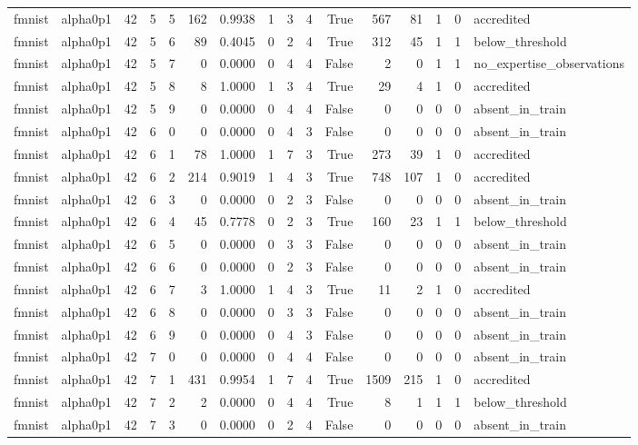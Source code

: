 \begin{tabular}{llrrrrrrrrrrrrrl}
fmnist & alpha0p1 & 42 & 5 & 5 & 162 & 0.9938 & 1 & 3 & 4 & True & 567 & 81 & 1 & 0 & accredited \\
fmnist & alpha0p1 & 42 & 5 & 6 & 89 & 0.4045 & 0 & 2 & 4 & True & 312 & 45 & 1 & 1 & below\_threshold \\
fmnist & alpha0p1 & 42 & 5 & 7 & 0 & 0.0000 & 0 & 4 & 4 & False & 2 & 0 & 1 & 1 & no\_expertise\_observations \\
fmnist & alpha0p1 & 42 & 5 & 8 & 8 & 1.0000 & 1 & 3 & 4 & True & 29 & 4 & 1 & 0 & accredited \\
fmnist & alpha0p1 & 42 & 5 & 9 & 0 & 0.0000 & 0 & 4 & 4 & False & 0 & 0 & 0 & 0 & absent\_in\_train \\
fmnist & alpha0p1 & 42 & 6 & 0 & 0 & 0.0000 & 0 & 4 & 3 & False & 0 & 0 & 0 & 0 & absent\_in\_train \\
fmnist & alpha0p1 & 42 & 6 & 1 & 78 & 1.0000 & 1 & 7 & 3 & True & 273 & 39 & 1 & 0 & accredited \\
fmnist & alpha0p1 & 42 & 6 & 2 & 214 & 0.9019 & 1 & 4 & 3 & True & 748 & 107 & 1 & 0 & accredited \\
fmnist & alpha0p1 & 42 & 6 & 3 & 0 & 0.0000 & 0 & 2 & 3 & False & 0 & 0 & 0 & 0 & absent\_in\_train \\
fmnist & alpha0p1 & 42 & 6 & 4 & 45 & 0.7778 & 0 & 2 & 3 & True & 160 & 23 & 1 & 1 & below\_threshold \\
fmnist & alpha0p1 & 42 & 6 & 5 & 0 & 0.0000 & 0 & 3 & 3 & False & 0 & 0 & 0 & 0 & absent\_in\_train \\
fmnist & alpha0p1 & 42 & 6 & 6 & 0 & 0.0000 & 0 & 2 & 3 & False & 0 & 0 & 0 & 0 & absent\_in\_train \\
fmnist & alpha0p1 & 42 & 6 & 7 & 3 & 1.0000 & 1 & 4 & 3 & True & 11 & 2 & 1 & 0 & accredited \\
fmnist & alpha0p1 & 42 & 6 & 8 & 0 & 0.0000 & 0 & 3 & 3 & False & 0 & 0 & 0 & 0 & absent\_in\_train \\
fmnist & alpha0p1 & 42 & 6 & 9 & 0 & 0.0000 & 0 & 4 & 3 & False & 0 & 0 & 0 & 0 & absent\_in\_train \\
fmnist & alpha0p1 & 42 & 7 & 0 & 0 & 0.0000 & 0 & 4 & 4 & False & 0 & 0 & 0 & 0 & absent\_in\_train \\
fmnist & alpha0p1 & 42 & 7 & 1 & 431 & 0.9954 & 1 & 7 & 4 & True & 1509 & 215 & 1 & 0 & accredited \\
fmnist & alpha0p1 & 42 & 7 & 2 & 2 & 0.0000 & 0 & 4 & 4 & True & 8 & 1 & 1 & 1 & below\_threshold \\
fmnist & alpha0p1 & 42 & 7 & 3 & 0 & 0.0000 & 0 & 2 & 4 & False & 0 & 0 & 0 & 0 & absent\_in\_train \\

\end{tabular}
